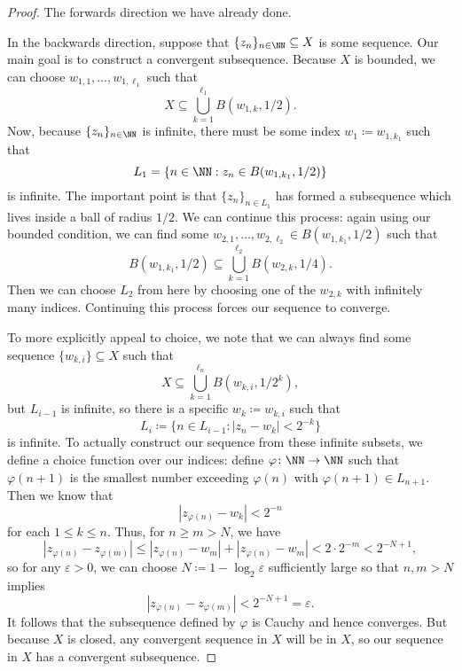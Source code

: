 \begin{proof}
	The forwards direction we have already done.

	In the backwards direction, suppose that $\{z_n\}_{n\in\NN}\subseteq X$ is some sequence. Our main goal is to construct a convergent subsequence. Because $X$ is bounded, we can choose $w_{1,1},\ldots,w_{1,\ell_1}$ such that
	\[X\subseteq\bigcup_{k=1}^{\ell_1}B(w_{1,k},1/2).\]
	Now, because $\{z_n\}_{n\in\NN}$ is infinite, there must be some index $w_1\coloneqq w_{1,k_1}$ such that
	\[L_1=\{n\in\NN:z_n\in B(w_{1,k_1},1/2)\}\]
	is infinite. The important point is that $\{z_n\}_{n\in L_1}$ has formed a subsequence which lives inside a ball of radius $1/2$. We can continue this process: again using our bounded condition, we can find some $w_{2,1},\ldots,w_{2,\ell_2}\in B(w_{1,k_1},1/2)$ such that
	\[B(w_{1,k_1},1/2)\subseteq\bigcup_{k=1}^{\ell_2}B(w_{2,k},1/4).\]
	Then we can choose $L_2$ from here by choosing one of the $w_{2,k}$ with infinitely many indices. Continuing this process forces our sequence to converge.

	To more explicitly appeal to choice, we note that we can always find some sequence $\{w_{k,i}\}\subseteq X$ such that
	\[X\subseteq\bigcup_{k=1}^{\ell_n}B(w_{k,i},1/2^k),\]
	but $L_{i-1}$ is infinite, so there is a specific $w_k\coloneqq w_{k,i}$ such that
	\[L_i\coloneqq \{n\in L_{i-1}:|z_n-w_{k}|<2^{-k}\}\]
	is infinite. To actually construct our sequence from these infinite subsets, we define a choice function over our indices: define $\varphi\colon \NN\to\NN$ such that $\varphi(n+1)$ is the smallest number exceeding $\varphi(n)$ with $\varphi(n+1)\in L_{n+1}$. Then we know that
	\[|z_{\varphi(n)}-w_{k}|<2^{-n}\]
	for each $1\le k\le n$. Thus, for $n\ge m>N$, we have
	\[|z_{\varphi(n)}-z_{\varphi(m)}|\le|z_{\varphi(n)}-w_m|+|z_{\varphi(n)}-w_m|<2\cdot2^{-m}<2^{-N+1},\]
	so for any $\varepsilon>0$, we can choose $N\coloneqq 1-\log_2\varepsilon$ sufficiently large so that $n,m>N$ implies
	\[|z_{\varphi(n)}-z_{\varphi(m)}|<2^{-N+1}=\varepsilon.\]
	It follows that the subsequence defined by $\varphi$ is Cauchy and hence converges. But because $X$ is closed, any convergent sequence in $X$ will be in $X$, so our sequence in $X$ has a convergent subsequence.
\end{proof}